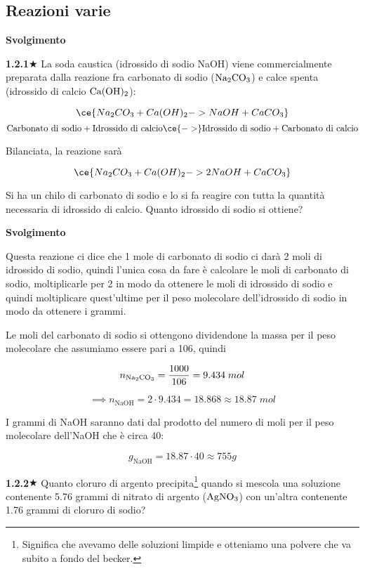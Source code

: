 \subsection{Reazioni varie}

\large\textbf{Svolgimento}\normalsize

\vspace{0.2cm}

\textbf{1.2.1}$\bigstar$ La soda caustica (idrossido di sodio NaOH) viene commercialmente preparata dalla reazione fra carbonato di sodio ($\rm Na_2CO_3$) e calce spenta (idrossido di calcio $\rm Ca(OH)_2$):

$$\ce{Na_2CO_3 + Ca(OH)_2 -> NaOH + CaCO_3}$$
$$\text{Carbonato di sodio} + \text{Idrossido di calcio} \ce{->} \text{Idrossido di sodio} + \text{Carbonato di calcio}$$

Bilanciata, la reazione sarà

$$\ce{Na_2CO_3 + Ca(OH)_2 -> 2NaOH + CaCO_3}$$

Si ha un chilo di carbonato di sodio e lo si fa reagire con tutta la quantità necessaria di idrossido di calcio. Quanto idrossido di sodio si ottiene?

\vspace{0.2cm}\large\textbf{Svolgimento}\normalsize

\vspace{0.2cm}Questa reazione ci dice che 1 mole di carbonato di sodio ci darà 2 moli di idrossido di sodio, quindi l'unica cosa da fare è calcolare le moli di carbonato di sodio, moltiplicarle per 2 in modo da ottenere le moli di idrossido di sodio e quindi moltiplicare quest'ultime per il peso molecolare dell'idrossido di sodio in modo da ottenere i grammi.

Le moli del carbonato di sodio si ottengono dividendone la massa per il peso molecolare che assumiamo essere pari a 106, quindi

$$n_{\rm Na_2CO_3}=\frac{1000}{106}=9.434 \; mol$$

$$\implies n_{\text{NaOH}}=2 \cdot 9.434=18.868 \approx 18.87 \; mol$$

I grammi di NaOH saranno dati dal prodotto del numero di moli per il peso molecolare dell'NaOH che è circa 40:

$$g_{\text{NaOH}}=18.87 \cdot 40 \approx 755 g$$


\textbf{1.2.2}$\bigstar$ Quanto cloruro di argento precipita\footnote{Significa che avevamo delle soluzioni limpide e otteniamo una polvere che va subito a fondo del becker.} quando si mescola una soluzione contenente 5.76 grammi di nitrato di argento ($\rm AgNO_3$) con un'altra contenente 1.76 grammi di cloruro di sodio?

